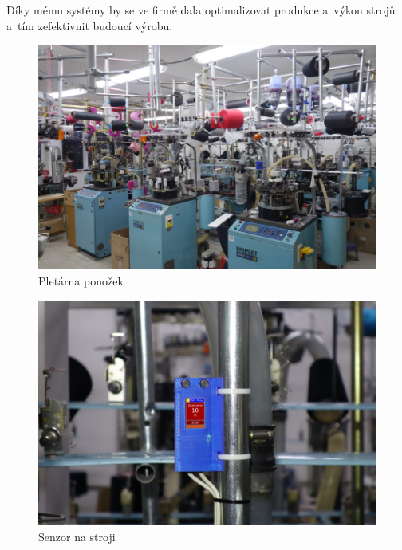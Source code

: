 Díky mému systémy by se ve firmě dala optimalizovat produkce a~výkon strojů a~tím zefektivnit budoucí výrobu. 

\begin{figure}[htbp]
    \centering
    \includegraphics[width=\textwidth]{img/pletarna.png}
    \caption{Pletárna ponožek}
    \label{fig:Pletarna}
\end{figure}

\begin{figure}[htbp]
    \centering
    \includegraphics[width=\textwidth]{img/V2-uchyceni-stop.png}
    \caption{Senzor na stroji}
    \label{fig:SenzorNaStroji}
\end{figure}


\newpage